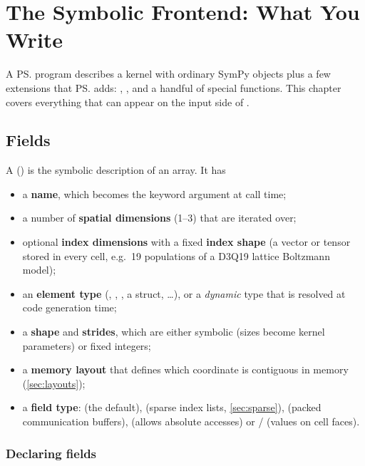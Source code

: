 \chapter{The Symbolic Frontend: What You Write}\label{ch:symbolic-frontend}

A \ps{} program describes a kernel with ordinary SymPy objects plus a few extensions
that \ps{} adds: , ,  and a
handful of special functions. This chapter covers everything that can appear on the
input side of .

\section{Fields}\label{sec:fields}

A  () is the symbolic description of an array.
It has
\begin{itemize}
  \item a \textbf{name}, which becomes the keyword argument at call time;
  \item a number of \textbf{spatial dimensions} (1--3) that are iterated over;
  \item optional \textbf{index dimensions} with a fixed \textbf{index shape} (a vector or
        tensor stored in every cell, e.g.\ 19 populations of a D3Q19 lattice Boltzmann
        model);
  \item an \textbf{element type} (, , , a
        struct, \dots), or a \emph{dynamic} type that is resolved at code generation
        time;
  \item a \textbf{shape} and \textbf{strides}, which are either symbolic (sizes become
        kernel parameters) or fixed integers;
  \item a \textbf{memory layout} that defines which coordinate is contiguous in memory
        (\cref{sec:layouts});
  \item a \textbf{field type}:  (the default),  (sparse
        index lists, \cref{sec:sparse}),  (packed communication buffers),
         (allows absolute accesses) or  /
         (values on cell faces).
\end{itemize}

\subsection{Declaring fields}

